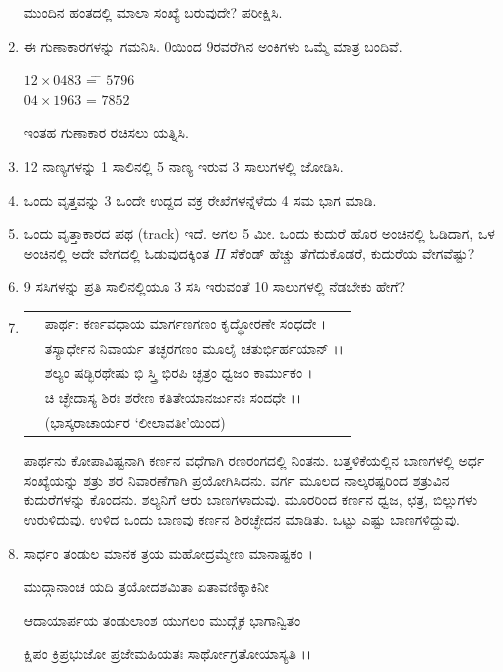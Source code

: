 \begin{enumerate}
ಮುಂದಿನ ಹಂತದಲ್ಲಿ ಮಾಲಾ ಸಂಖ್ಯೆ ಬರುವುದೇ? ಪರೀಕ್ಷಿಸಿ. 

\item ಈ ಗುಣಾಕಾರಗಳನ್ನು ಗಮನಿಸಿ. 0ಯಿಂದ 9ರವರೆಗಿನ ಅಂಕಿಗಳು ಒಮ್ಮೆ ಮಾತ್ರ ಬಂದಿವೆ. 
{\fontsize{11pt}{13pt}\selectfont
\begin{tabbing}
$12\times 0483$ \= = \= $5796$\\
$04\times 1963$ \> =  \> $7852$
\end{tabbing}}\relax
ಇಂತಹ ಗುಣಾಕಾರ ರಚಿಸಲು ಯತ್ನಿಸಿ. 

\item 12 ನಾಣ್ಯಗಳನ್ನು 1 ಸಾಲಿನಲ್ಲಿ 5 ನಾಣ್ಯ ಇರುವ 3 ಸಾಲುಗಳಲ್ಲಿ ಜೋಡಿಸಿ. 

\item ಒಂದು ವೃತ್ತವನ್ನು 3 ಒಂದೇ ಉದ್ದದ ವಕ್ರ ರೇಖೆಗಳನ್ನೆಳೆದು 4 ಸಮ ಭಾಗ ಮಾಡಿ. 

\item ಒಂದು ವೃತ್ತಾಕಾರದ ಪಥ (track) ಇದೆ. ಅಗಲ 5 ಮೀ. ಒಂದು ಕುದುರೆ ಹೊರ ಅಂಚಿನಲ್ಲಿ ಓಡಿದಾಗ, ಒಳ ಅಂಚಿನಲ್ಲಿ ಅದೇ ವೇಗದಲ್ಲಿ ಓಡುವುದಕ್ಕಿಂತ $\Pi$ ಸೆಕೆಂಡ್ ಹೆಚ್ಚು ತೆಗೆದುಕೊಡರೆ, ಕುದುರೆಯ ವೇಗವೆಷ್ಟು? 

\item 9 ಸಸಿಗಳನ್ನು ಪ್ರತಿ ಸಾಲಿನಲ್ಲಿಯೂ 3 ಸಸಿ ಇರುವಂತೆ 10 ಸಾಲುಗಳಲ್ಲಿ ನೆಡಬೇಕು ಹೇಗೆ? 

\item 
\begin{tabular}[t]{ll}
&ಪಾರ್ಥ: ಕರ್ಣವಧಾಯ ಮಾರ್ಗಣಗಣಂ ಕೃದ್ಧೋರಣೇ ಸಂಧದೇ ।\\
&ತಸ್ಯಾರ್ಧೇನ ನಿವಾರ್ಯ ತಚ್ಛರಗಣಂ ಮೂಲೈ ಚತುರ್ಭಿರ್ಹಯಾನ್ ।।\\
&ಶಲ್ಯಂ ಷಡ್ಭಿರಥೇಷು ಭಿ ಸ್ತ್ರಿ ಭಿರಪಿ ಚ್ಛತ್ರಂ ಧ್ವಜಂ ಕಾರ್ಮುಕಂ ।\\
&ಚಿ ಚ್ಛೇದಾಸ್ಯ ಶಿರಃ ಶರೇಣ ಕತಿತೇಯಾನರ್ಜುನಃ ಸಂದಧೇ ।।\\
&\hfill{(ಭಾಸ್ಕರಾಚಾರ್ಯರ `ಲೀಲಾವತೀ'ಯಿಂದ)}
\end{tabular}

\vfill\eject

ಪಾರ್ಥನು ಕೋಪಾವಿಷ್ಟನಾಗಿ ಕರ್ಣನ ವಧೆಗಾಗಿ ರಣರಂಗದಲ್ಲಿ ನಿಂತನು. ಬತ್ತಳಿಕೆಯಲ್ಲಿನ ಬಾಣಗಳಲ್ಲಿ ಅರ್ಧ ಸಂಖ್ಯೆಯನ್ನು ಶತ್ರು ಶರ ನಿವಾರಣೆಗಾಗಿ ಪ್ರಯೋಗಿಸಿದನು. ವರ್ಗ ಮೂಲದ ನಾಲ್ಕರಷ್ಟರಿಂದ ಶತ್ರುವಿನ ಕುದುರೆಗಳನ್ನು ಕೊಂದನು. ಶಲ್ಯನಿಗೆ ಆರು ಬಾಣಗಳಾದುವು. ಮೂರರಿಂದ ಕರ್ಣನ ಧ್ವಜ, ಛತ್ರ, ಬಿಲ್ಲುಗಳು ಉರುಳಿದುವು. ಉಳಿದ ಒಂದು ಬಾಣವು ಕರ್ಣನ ಶಿರಚ್ಛೇದನ ಮಾಡಿತು. ಒಟ್ಟು ಎಷ್ಟು ಬಾಣಗಳಿದ್ದುವು. 

\item ಸಾರ್ಧಂ ತಂಡುಲ ಮಾನಕ ತ್ರಯ ಮಹೋದ್ರಮ್ಮೇಣ ಮಾನಾಷ್ಟಕಂ ।

ಮುದ್ಗಾನಾಂಚ ಯದಿ ತ್ರಯೋದಶಮಿತಾ ಏತಾವಣಿಕ್ಕಾಕಿನೀ 

ಆದಾಯಾರ್ಪಯ ತಂಡುಲಾಂಶ ಯುಗಲಂ ಮುದ್ಗೈಕ ಭಾಗಾನ್ವಿತಂ 

ಕ್ಷಿಪಂ ಕ್ರಿಪ್ರಭುಜೋ ಪ್ರಜೇಮಹಿಯತಃ ಸಾರ್ಥೋಗ್ರತೋಯಾಸ್ಯತಿ ।।


\end{enumerate}
